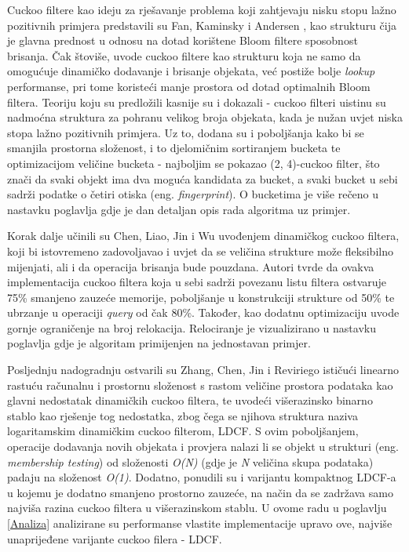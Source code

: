 \documentclass[times, utf8, seminar, numeric]{fer}
\begin{document}
Cuckoo filtere kao ideju za rješavanje problema koji zahtjevaju nisku stopu lažno pozitivnih primjera predstavili su Fan, Kaminsky i Andersen \cite{DBLP:journals/usenix-login/FanAK13}, kao strukturu čija je glavna prednost u odnosu na dotad korištene Bloom filtere sposobnost brisanja. Čak štoviše, uvode cuckoo filtere kao strukturu koja ne samo da omogućuje dinamičko dodavanje i brisanje objekata, već postiže bolje \textit{lookup} performanse, pri tome koristeći manje prostora od dotad optimalnih Bloom filtera.
Teoriju koju su predložili kasnije su i dokazali \cite{10.1145/2674005.2674994} - cuckoo filteri uistinu su nadmoćna struktura za pohranu velikog broja objekata, kada je nužan uvjet niska stopa lažno pozitivnih primjera. Uz to, dodana su i poboljšanja kako bi se smanjila prostorna složenost, i to djelomičnim sortiranjem bucketa te optimizacijom veličine bucketa - najboljim se pokazao (2, 4)-cuckoo filter, što znači da svaki objekt ima dva moguća kandidata za bucket, a svaki bucket u sebi sadrži podatke o četiri otiska (eng. \textit{fingerprint}). O bucketima je više rečeno u nastavku poglavlja gdje je dan detaljan opis rada algoritma uz primjer.

Korak dalje učinili su Chen, Liao, Jin i Wu \cite{8117563} uvođenjem dinamičkog cuckoo filtera, koji bi istovremeno zadovoljavao i uvjet da se veličina strukture može fleksibilno mijenjati, ali i da operacija brisanja bude pouzdana. Autori tvrde da ovakva implementacija cuckoo filtera koja u sebi sadrži povezanu listu filtera ostvaruje 75\% smanjeno zauzeće memorije, poboljšanje u konstrukciji strukture od 50\% te ubrzanje u operaciji \textit{query} od čak 80\%. Također, kao dodatnu optimizaciju uvode gornje ograničenje na broj relokacija. Relociranje je vizualizirano u nastavku poglavlja gdje je algoritam primijenjen na jednostavan primjer.

Posljednju nadogradnju ostvarili su Zhang, Chen, Jin i Reviriego \cite{9458864} ističući linearno rastuću računalnu i prostornu složenost s rastom veličine prostora podataka kao glavni nedostatak dinamičkih cuckoo filtera, te uvodeći višerazinsko binarno stablo kao rješenje tog nedostatka, zbog čega se njihova struktura naziva logaritamskim dinamičkim cuckoo filterom, LDCF. S ovim poboljšanjem, operacije dodavanja novih objekata i provjera nalazi li se objekt u strukturi (eng. \textit{membership testing}) od složenosti \textit{O(N)} (gdje je \textit{N} veličina skupa podataka) padaju na složenost \textit{O(1)}. Dodatno, ponudili su i varijantu kompaktnog LDCF-a u kojemu je dodatno smanjeno prostorno zauzeće, na način da se zadržava samo najviša razina cuckoo filtera u višerazinskom stablu. U ovome radu u poglavlju \ref{Analiza} analizirane su performanse vlastite implementacije upravo ove, najviše unaprijeđene varijante cuckoo filera - LDCF.
\end{document}
